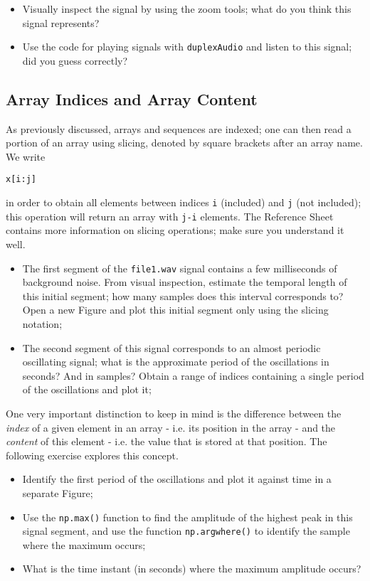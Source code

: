 \begin{itemize}
	\item Visually inspect the signal by using the zoom tools; what do you think this signal represents? 
	\item Use the code for playing signals with {\tt duplexAudio} and listen to this signal; did you guess correctly?
\end{itemize}

\subsection{Array Indices and Array Content}

As previously discussed, arrays and sequences are indexed; one can then read a portion of an array using slicing, denoted by square brackets after an array name. We write

\begin{lstlisting}[frame=single]
x[i:j]
\end{lstlisting}

in order to obtain all elements between indices {\tt i} (included) and {\tt j} (not included); this operation will return an array with {\tt j-i} elements. The Reference Sheet contains more information on slicing operations; make sure you understand it well.

\begin{itemize}
	\item The first segment of the {\tt file1.wav} signal contains a few milliseconds of background noise. From visual inspection, estimate the temporal length of this initial segment; how many samples does this interval corresponds to? Open a new Figure and plot this initial segment only using the slicing notation;
	\item The second segment of this signal corresponds to an almost periodic oscillating signal; what is the approximate period of the oscillations in seconds? And in samples? Obtain a range of indices containing a single period of the oscillations and plot it;
\end{itemize}

One very important distinction to keep in mind is the difference between the \emph{index} of a given element in an array - i.e. its position in the array - and the \emph{content} of this element - i.e. the value that is stored at that position. The following exercise explores this concept.

\begin{itemize}
	\item Identify the first period of the oscillations and plot it against time in a separate Figure;
	\item Use the {\tt np.max()} function to find the amplitude of the highest peak in this signal segment, and use the function {\tt np.argwhere()} to identify the sample where the maximum occurs;
	\item What is the time instant (in seconds) where the maximum amplitude occurs?
\end{itemize}


